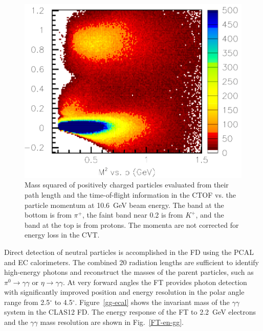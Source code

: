 \documentclass[final,3p]{elsarticle}
\begin{document}
\begin{twocolumn}
\begin{figure}[t!]
\centerline{\includegraphics[width=1.\columnwidth]{ctof-pid-3.png}}
\caption{Mass squared of positively charged particles evaluated from their path length and the time-of-flight
  information in the CTOF vs. the particle momentum at 10.6~GeV beam energy. The band at the bottom is from
  $\pi^+$, the faint band near 0.2 is from $K^+$, and the band at the top is from protons. The momenta are not
  corrected for energy loss in the CVT.}
\label{CD-PID}
\end{figure} 

Direct detection of neutral particles is accomplished in the FD using the PCAL and EC calorimeters. The combined
20 radiation lengths are sufficient to identify high-energy photons and reconstruct the masses of the parent
particles, such as $\pi^0\to \gamma \gamma$  or $\eta \to \gamma \gamma$. At very forward angles the FT
provides photon detection with significantly improved position and energy resolution in the polar angle range from
2.5$^\circ$ to 4.5$^\circ$. Figure~\ref{gg-ecal} shows the invariant mass of the $\gamma\gamma$ system in the
CLAS12 FD. The energy response of the FT to 2.2~GeV electrons and the $\gamma \gamma$ mass resolution are
shown in Fig.~\ref{FT-en-gg}. 


\end{twocolumn}
\end{document}
